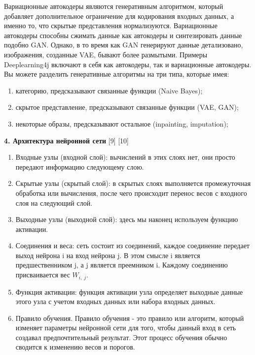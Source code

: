 \documentclass{article}
\begin{document}
Вариационные автокодеры являются генеративным алгоритмом, который добавляет дополнительное ограничение для кодирования входных данных, а именно то, что скрытые представления нормализуются. Вариационные автокодеры способны сжимать данные как автокодеры и синтезировать данные подобно GAN. Однако, в то время как GAN генерируют данные детализовано, изображения, созданные VAE, бывают более размытыми. Примеры Deeplearning4j включают в себя как автокодеры, так и вариационные автокодеры.
Вы можете разделить генеративные алгоритмы на три типа, которые имея:
\begin{enumerate} 
\item категорию, предсказывают связанные функции (Naive Bayes);
\item скрытое представление, предсказывают связанные функции (VAE, GAN);
\item некоторые образы, предсказывают остальное (inpainting, imputation); \\ 
\end{enumerate}
    \textbf{4. Архитектура нейронной сети} [9] [10]
    \begin{enumerate} 
\item Входные узлы (входной слой): вычислений в этих слоях нет, они просто передают информацию следующему слою.
\item Скрытые узлы (скрытый слой): в скрытых слоях выполняется промежуточная обработка или вычисления, после чего происходит перенос весов с входного слоя на следующий слой.
\item Выходные узлы (выходной слой): здесь мы наконец используем функцию активации.
\item Соединения и веса: сеть состоит из соединений, каждое соединение передает выход нейрона i на вход нейрона j. В этом смысле i является предшественником j, а j является преемником i. Каждому соединению присваивается вес $W_{i,\;j}$.
\item Функция активации: функция активации узла определяет выходные данные этого узла с учетом входных данных или набора входных данных.
\item Правило обучения. Правило обучения - это правило или алгоритм, который изменяет параметры нейронной сети для того, чтобы данный вход в сеть создавал предпочтительный результат. Этот процесс обучения обычно сводится к изменению весов и порогов.\\
\end{enumerate}
    
\end{document}
